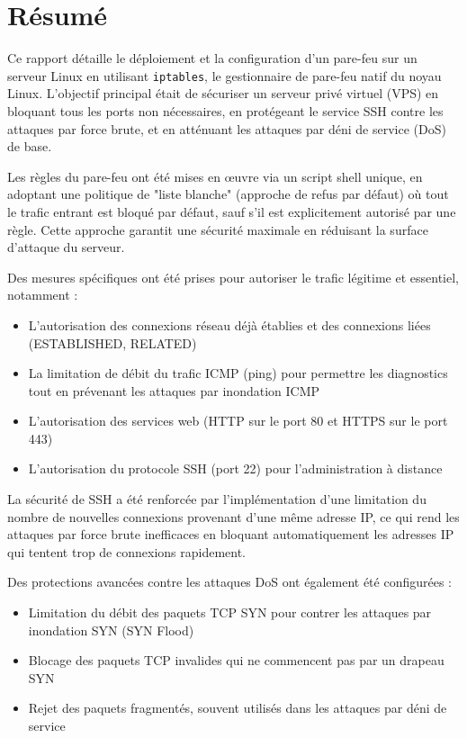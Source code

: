 \chapter*{Résumé}

Ce rapport détaille le déploiement et la configuration d'un pare-feu sur un serveur Linux en utilisant \texttt{iptables}, le gestionnaire de pare-feu natif du noyau Linux. L'objectif principal était de sécuriser un serveur privé virtuel (VPS) en bloquant tous les ports non nécessaires, en protégeant le service SSH contre les attaques par force brute, et en atténuant les attaques par déni de service (DoS) de base. 

Les règles du pare-feu ont été mises en œuvre via un script shell unique, en adoptant une politique de "liste blanche" (approche de refus par défaut) où tout le trafic entrant est bloqué par défaut, sauf s'il est explicitement autorisé par une règle. Cette approche garantit une sécurité maximale en réduisant la surface d'attaque du serveur.

Des mesures spécifiques ont été prises pour autoriser le trafic légitime et essentiel, notamment :
\begin{itemize}
    \item L'autorisation des connexions réseau déjà établies et des connexions liées (ESTABLISHED, RELATED)
    \item La limitation de débit du trafic ICMP (ping) pour permettre les diagnostics tout en prévenant les attaques par inondation ICMP
    \item L'autorisation des services web (HTTP sur le port 80 et HTTPS sur le port 443)
    \item L'autorisation du protocole SSH (port 22) pour l'administration à distance
\end{itemize}

La sécurité de SSH a été renforcée par l'implémentation d'une limitation du nombre de nouvelles connexions provenant d'une même adresse IP, ce qui rend les attaques par force brute inefficaces en bloquant automatiquement les adresses IP qui tentent trop de connexions rapidement.

Des protections avancées contre les attaques DoS ont également été configurées :
\begin{itemize}
    \item Limitation du débit des paquets TCP SYN pour contrer les attaques par inondation SYN (SYN Flood)
    \item Blocage des paquets TCP invalides qui ne commencent pas par un drapeau SYN
    \item Rejet des paquets fragmentés, souvent utilisés dans les attaques par déni de service
\end{itemize}

